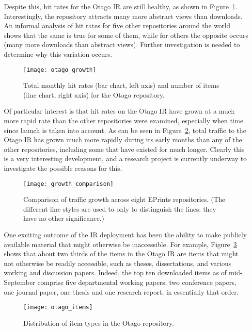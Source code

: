 \documentclass[12pt,pdftex,a4paper,titlepage]{article}
\begin{document}
Despite this, hit rates for the Otago IR are still healthy, as shown in Figure~\ref{fig-otago-growth}. Interestingly, the repository attracts many more abstract views than downloads. An informal analysis of hit rates for five other repositories around the world shows that the same is true for some of them, while for others the opposite occurs (many more downloads than abstract views). Further investigation is needed to determine why this variation occurs.


\begin{figure}
	\centering
	\texttt{[image: otago\_growth]}
	\caption{Total monthly hit rates (bar chart, left axis) and number of items (line chart, right axis) for the Otago repository.}
	\label{fig-otago-growth}
\end{figure}


Of particular interest is that hit rates on the Otago IR have grown at a much more rapid rate than the other repositories were examined, especially when time since launch is taken into account. As can be seen in Figure~\ref{fig-growth-comparison}, total traffic to the Otago IR has grown much more rapidly during its early months than any of the other repositories, including some that have existed for much longer. Clearly this is a very interesting development, and a research project is currently underway to investigate the possible reasons for this.


\begin{figure}
	\centering
	\texttt{[image: growth\_comparison]}
	\caption{Comparison of traffic growth across eight EPrints repositories. (The different line styles are used to only to distinguish the lines; they have no other significance.)}
	\label{fig-growth-comparison}
\end{figure}


One exciting outcome of the IR deployment has been the ability to make publicly available material that might otherwise be inaccessible. For example, Figure~\ref{fig-item-types} shows that about two thirds of the items in the Otago IR are items that might not otherwise be readily accessible, such as theses, dissertations, and various working and discussion papers. Indeed, the top ten downloaded items as of mid-September comprise five departmental working papers, two conference papers, one journal paper, one thesis and one research report, in essentially that order.


\begin{figure}
	\centering
	\texttt{[image: otago\_items]}
	\caption{Distribution of item types in the Otago repository.}
	\label{fig-item-types}
\end{figure}
\end{document}
